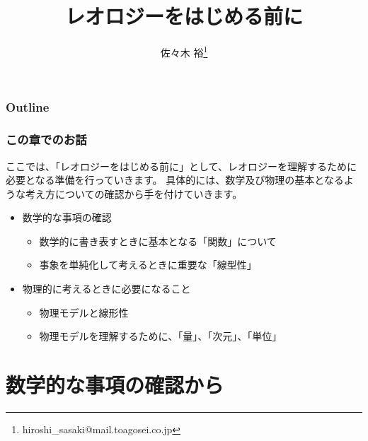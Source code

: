 \documentclass[12pt, dvipdfmx]{beamer}
\title
[レオロジーをはじめる前に]
{レオロジーをはじめる前に}
\author[東亞合成　佐々木]{佐々木 裕\thanks{hiroshi\_sasaki@mail.toagosei.co.jp}}
\institute[東亞合成]{東亞合成株式会社}
\date{}
\begin{document}
\maketitle

\begin{frame}
\frametitle{Outline}
\tableofcontents
\end{frame}

\begin{frame}
	\frametitle{この章でのお話}
		ここでは、「レオロジーをはじめる前に」として、レオロジーを理解するために必要となる準備を行っていきます。
		具体的には、数学及び物理の基本となるような考え方についての確認から手を付けていきます。
			\begin{itemize}
				\item 数学的な事項の確認
				\begin{itemize}
					\item 数学的に書き表すときに基本となる「関数」について
					\item 事象を単純化して考えるときに重要な「線型性」
				\end{itemize}
				\item 物理的に考えるときに必要になること
				\begin{itemize}
					\item 物理モデルと線形性
					\item 物理モデルを理解するために、「量」、「次元」、「単位」
				\end{itemize}
			\end{itemize} 
\end{frame}

\section{数学的な事項の確認から}
\end{document}
